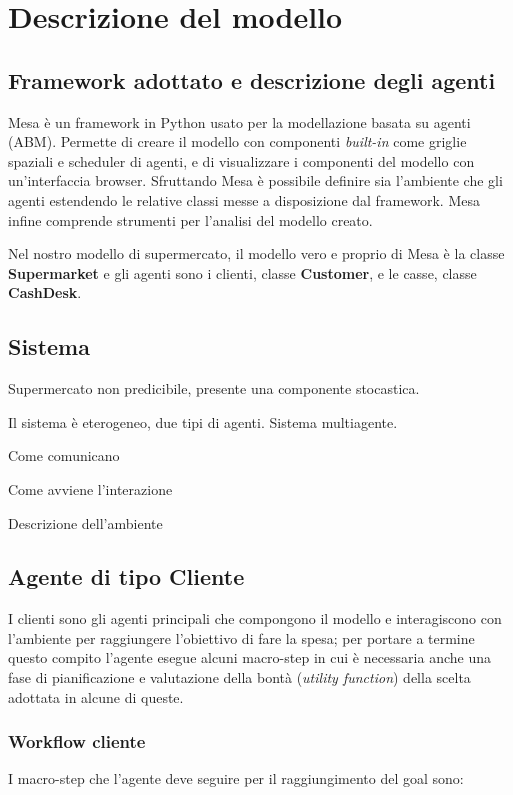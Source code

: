 \chapter{Descrizione del modello}

\section{Framework adottato e descrizione degli agenti}

 Mesa è un framework in Python usato per la modellazione basata su agenti (ABM). Permette di creare il modello con componenti \textit{built-in} come griglie spaziali e scheduler di agenti, e di visualizzare i componenti del modello con un'interfaccia browser. Sfruttando Mesa è possibile definire sia l'ambiente che gli agenti estendendo le relative classi messe a disposizione dal framework. Mesa infine comprende strumenti per l'analisi del modello creato.

Nel nostro modello di supermercato, il modello vero e proprio di Mesa è la classe \textbf{Supermarket} e gli agenti sono i clienti, classe \textbf{Customer}, e le casse, classe \textbf{CashDesk}. 

\section{Sistema}
Supermercato non predicibile, presente una componente stocastica.

Il sistema è eterogeneo, due tipi di agenti. Sistema multiagente.

Come comunicano

Come avviene l'interazione

Descrizione dell'ambiente

\section{Agente di tipo Cliente}
I clienti sono gli agenti principali che compongono il modello e interagiscono con l'ambiente per raggiungere l'obiettivo di fare la spesa; per portare a termine questo compito l'agente esegue alcuni macro-step in cui è necessaria anche una fase di pianificazione e valutazione della bontà (\textit{utility function}) della scelta adottata in alcune di queste.

\subsection{Workflow cliente}
I macro-step che l'agente deve seguire per il raggiungimento del goal sono:

